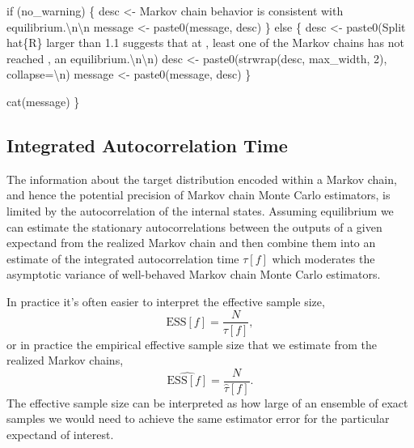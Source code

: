 \documentclass[
  letterpaper,
  DIV=11,
  numbers=noendperiod]{scrartcl}
\newenvironment{Shaded}{\begin{snugshade}}{\end{snugshade}}
\newcommand{\CharTok}[1]{\textcolor[rgb]{0.13,0.47,0.30}{#1}}
\newcommand{\ControlFlowTok}[1]{\textcolor[rgb]{0.00,0.23,0.31}{#1}}
\newcommand{\DecValTok}[1]{\textcolor[rgb]{0.68,0.00,0.00}{#1}}
\newcommand{\NormalTok}[1]{\textcolor[rgb]{0.00,0.23,0.31}{#1}}
\newcommand{\OperatorTok}[1]{\textcolor[rgb]{0.37,0.37,0.37}{#1}}
\newcommand{\SpecialCharTok}[1]{\textcolor[rgb]{0.37,0.37,0.37}{#1}}
\newcommand{\StringTok}[1]{\textcolor[rgb]{0.13,0.47,0.30}{#1}}
\begin{document}
\begin{Shaded}
\begin{Highlighting}[]
  \ControlFlowTok{if}\NormalTok{ (no\_warning) \{}
\NormalTok{    desc }\OperatorTok{\textless{}{-}} \StringTok{\textquotesingle{}Markov chain behavior is consistent with equilibrium.}\CharTok{\textbackslash{}n\textbackslash{}n}\StringTok{\textquotesingle{}}
\NormalTok{    message }\OperatorTok{\textless{}{-}}\NormalTok{ paste0(message, desc)}
\NormalTok{  \} }\ControlFlowTok{else}\NormalTok{ \{}
\NormalTok{    desc }\OperatorTok{\textless{}{-}}\NormalTok{ paste0(}\StringTok{\textquotesingle{}Split hat}\SpecialCharTok{\{R\}}\StringTok{ larger than 1.1 suggests that at \textquotesingle{}}\NormalTok{,}
                   \StringTok{\textquotesingle{}least one of the Markov chains has not reached \textquotesingle{}}\NormalTok{,}
                   \StringTok{\textquotesingle{}an equilibrium.}\CharTok{\textbackslash{}n\textbackslash{}n}\StringTok{\textquotesingle{}}\NormalTok{)}
\NormalTok{    desc }\OperatorTok{\textless{}{-}}\NormalTok{ paste0(strwrap(desc, max\_width, }\DecValTok{2}\NormalTok{), collapse}\OperatorTok{=}\StringTok{\textquotesingle{}}\CharTok{\textbackslash{}n}\StringTok{\textquotesingle{}}\NormalTok{)}
\NormalTok{    message }\OperatorTok{\textless{}{-}}\NormalTok{ paste0(message, desc)}
\NormalTok{  \}}
  
\NormalTok{  cat(message)}
\NormalTok{\}}
\end{Highlighting}
\end{Shaded}

\subsection{Integrated Autocorrelation
Time}\label{integrated-autocorrelation-time}

The information about the target distribution encoded within a Markov
chain, and hence the potential precision of Markov chain Monte Carlo
estimators, is limited by the autocorrelation of the internal states.
Assuming equilibrium we can estimate the stationary autocorrelations
between the outputs of a given expectand from the realized Markov chain
and then combine them into an estimate of the integrated autocorrelation
time \(\tau[f]\) which moderates the asymptotic variance of well-behaved
Markov chain Monte Carlo estimators.

In practice it's often easier to interpret the effective sample size, \[
\text{ESS}[f] = \frac{N}{\tau[f]},
\] or in practice the empirical effective sample size that we estimate
from the realized Markov chains, \[
\hat{\text{ESS}[f]} = \frac{N}{\hat{\tau}[f]}.
\] The effective sample size can be interpreted as how large of an
ensemble of exact samples we would need to achieve the same estimator
error for the particular expectand of interest.
\end{document}
